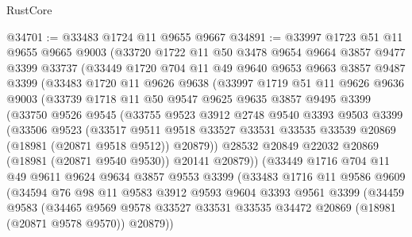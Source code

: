 \begin{lexlean}{RustCore}
\begin{coremodule}
@34701 := @33483 @1724 @11 @9655 @9667
@34891 := @33997
    @1723
    @51
    @11
    @9655
    @9665
    @9003
    (@33720
      @1722
      @11
      @50
      @3478
      @9654
      @9664
      @3857
      @9477
      @3399
      @33737
      (@33449
        @1720
        @704
        @11
        @49
        @9640
        @9653
        @9663
        @3857
        @9487
        @3399
        (@33483
          @1720
          @11
          @9626
          @9638
          (@33997
            @1719
            @51
            @11
            @9626
            @9636
            @9003
            (@33739
              @1718
              @11
              @50
              @9547
              @9625
              @9635
              @3857
              @9495
              @3399
              (@33750
                @9526
                @9545
                (@33755
                  @9523
                  @3912
                  @2748
                  @9540
                  @3393
                  @9503
                  @3399
                  (@33506
                    @9523
                    (@33517
                      @9511
                      @9518
                      @33527
                      @33531
                      @33535
                      @33539
                      @20869
                      (@18981 (@20871 @9518 @9512))
                      @20879))
                  @28532
                  @20849
                  @22032
                  @20869
                  (@18981 (@20871 @9540 @9530))
                  @20141
                  @20879))
              (@33449
                @1716
                @704
                @11
                @49
                @9611
                @9624
                @9634
                @3857
                @9553
                @3399
                (@33483
                  @1716
                  @11
                  @9586
                  @9609
                  (@34594
                    @76
                    @98
                    @11
                    @9583
                    @3912
                    @9593
                    @9604
                    @3393
                    @9561
                    @3399
                    (@34459
                      @9583
                      (@34465
                        @9569
                        @9578
                        @33527
                        @33531
                        @33535
                        @34472
                        @20869
                        (@18981 (@20871 @9578 @9570))
                        @20879))

\end{coremodule}
\end{lexlean}
